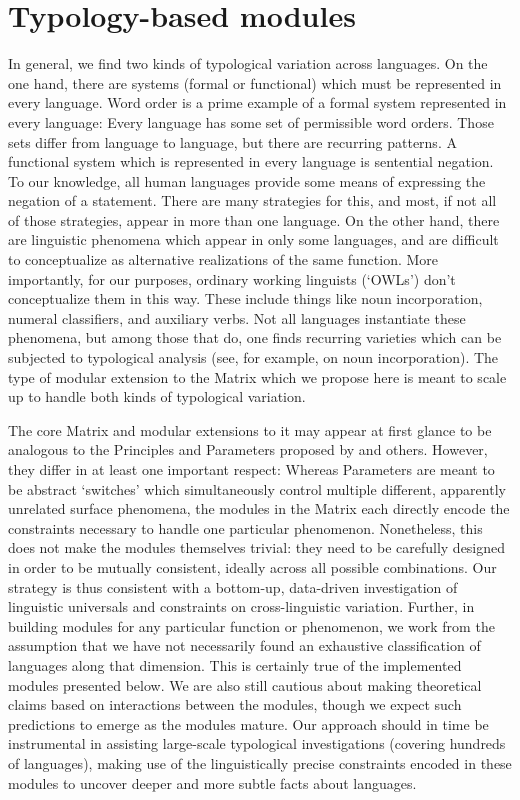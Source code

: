 \documentclass[11pt]{article}
\begin{document}
\section{Typology-based modules}

In general, we find two kinds of typological variation across
languages.  On the one hand, there are systems (formal or functional)
which must be represented in every language.  Word order is a prime
example of a formal system represented in every language: Every
language has some set of permissible word orders.  Those sets differ
from language to language, but there are recurring patterns.
A functional system which is represented in every language is
sentential negation.  To our knowledge, all human languages provide
some means of expressing the negation of a statement.  There are many
strategies for this, and most, if not all of those strategies, appear
in more than one language.  On the other hand, there are linguistic
phenomena which appear in only some languages, and are difficult to
conceptualize as alternative realizations of the same function.  More
importantly, for our purposes, ordinary working linguists (`OWLs')
don't conceptualize them in this way.  These include things like
noun incorporation, numeral classifiers, and auxiliary verbs.
Not all languages instantiate these phenomena, but among those that
do, one finds recurring varieties which can be subjected to typological
analysis (see, for example, \cite{Mithun:84} on noun incorporation).
The type of modular extension to the Matrix which we propose here
is meant to scale up to handle both kinds of typological variation.

The core Matrix and modular extensions to it may appear at first
glance to be analogous to the Principles and Parameters proposed
by  and others.
However, they differ in at least one important respect:
Whereas Parameters are meant to be abstract `switches'
which simultaneously control multiple different, apparently 
unrelated surface phenomena, the modules in the Matrix each directly
encode the constraints necessary to handle one particular phenomenon.
Nonetheless, this does not make the modules themselves trivial:
they need to be carefully designed in order to be mutually
consistent, ideally across all possible combinations.  Our strategy
is thus consistent with a
bottom-up, data-driven investigation of linguistic universals and
constraints on cross-linguistic variation.  Further, in building modules
for any particular function or phenomenon, we work from the assumption
that we have not necessarily found an exhaustive classification of languages
along that dimension.  This is certainly true of the implemented
modules presented below.  We are also still cautious about making
theoretical claims based on interactions between the modules, though
we expect such predictions to emerge as the modules mature.
Our approach should in time be instrumental in assisting large-scale 
typological investigations (covering hundreds of languages), making use
of the linguistically precise constraints encoded in these modules to
uncover deeper and more subtle facts about languages.
\end{document}
